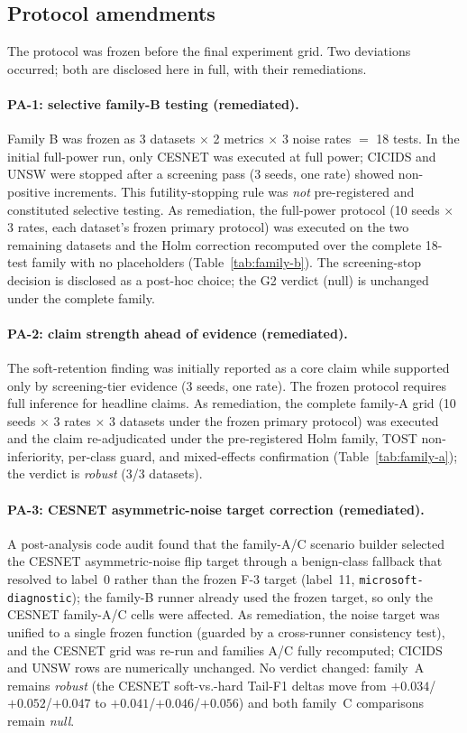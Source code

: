 \documentclass[pdflatex,referee,lineno,sn-basic,Numbered]{sn-jnl}
\begin{document}
\begin{appendices}
\section{Protocol amendments}
\label{app:amendments}
The protocol was frozen before the final experiment grid. Two deviations
occurred; both are disclosed here in full, with their remediations.

\paragraph{PA-1: selective family-B testing (remediated).}
Family B was frozen as 3 datasets $\times$ 2 metrics $\times$ 3 noise rates
$=$ 18 tests. In the initial full-power run, only CESNET was executed at full
power; CICIDS and UNSW were stopped after a screening pass (3 seeds, one rate)
showed non-positive increments. This futility-stopping rule was \emph{not}
pre-registered and constituted selective testing. As remediation, the
full-power protocol (10 seeds $\times$ 3 rates, each dataset's frozen primary
protocol) was executed on the two remaining datasets and the Holm correction
recomputed over the complete 18-test family with no placeholders
(Table~\ref{tab:family-b}). The screening-stop decision is disclosed as a
post-hoc choice; the G2 verdict (null) is unchanged under the complete family.

\paragraph{PA-2: claim strength ahead of evidence (remediated).}
The soft-retention finding was initially reported as a core claim while
supported only by screening-tier evidence (3 seeds, one rate). The frozen
protocol requires full inference for headline claims. As remediation, the
complete family-A grid (10 seeds $\times$ 3 rates $\times$ 3 datasets under the
frozen primary protocol) was executed and the claim re-adjudicated under the
pre-registered Holm family, TOST non-inferiority, per-class guard, and
mixed-effects confirmation (Table~\ref{tab:family-a}); the verdict is
\emph{robust} (3/3 datasets).

\paragraph{PA-3: CESNET asymmetric-noise target correction (remediated).}
A post-analysis code audit found that the family-A/C scenario builder selected
the CESNET asymmetric-noise flip target through a benign-class fallback that
resolved to label~0 rather than the frozen F-3 target (label~11,
\texttt{microsoft-diagnostic}); the family-B runner already used the frozen
target, so only the CESNET family-A/C cells were affected. As remediation, the
noise target was unified to a single frozen function (guarded by a
cross-runner consistency test), and the CESNET grid was re-run and families
A/C fully recomputed; CICIDS and UNSW rows are numerically unchanged. No
verdict changed: family~A remains \emph{robust} (the CESNET soft-vs.-hard
Tail-F1 deltas move from $+0.034$/$+0.052$/$+0.047$ to
$+0.041$/$+0.046$/$+0.056$) and both family~C comparisons remain \emph{null}.


\end{appendices}
\end{document}
